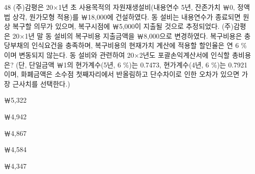 \begin{question}{48}
(주)감평은 20×1년 초 사용목적의 자원재생설비(내용연수 5년, 잔존가치 ￦0, 정액법 상각, 원가모형 적용)를 ￦18,000에 건설하였다. 동 설비는 내용연수가 종료되면 원상 복구할 의무가 있으며, 복구시점에 ￦5,000이 지출될 것으로 추정되었다.
(주)감평은 20×1년 말 동 설비의 복구비용 지출금액을 ￦8,000으로 변경하였다. 복구비용은 충당부채의 인식요건을 충족하며, 복구비용의 현재가치 계산에 적용할 할인율은 연 6 \%이며 변동되지 않는다. 동 설비와 관련하여 20×2년도 포괄손익계산서에 인식할 총비용은? (단, 단일금액 ￦1의 현가계수(5년, 6 \%)는 0.7473, 현가계수(4년, 6 \%)는 0.7921이며, 화폐금액은 소수점 첫째자리에서 반올림하고 단수차이로 인한 오차가 있으면 가장 근사치를 선택한다.) \par
\begin{choices}
  \item ￦5,322
  \item ￦4,942
  \item ￦4,867
  \item ￦4,584
  \item ￦4,347
\end{choices}
\end{question}
